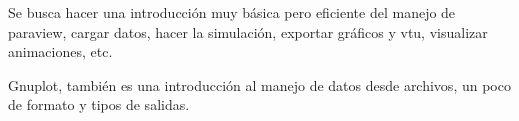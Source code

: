 Se busca hacer una introducción muy básica pero eficiente del manejo de paraview, cargar datos,
hacer la simulación, exportar gráficos y vtu, visualizar animaciones, etc. 

Gnuplot, también es una introducción al manejo de datos desde archivos, un poco de formato y
tipos de salidas.